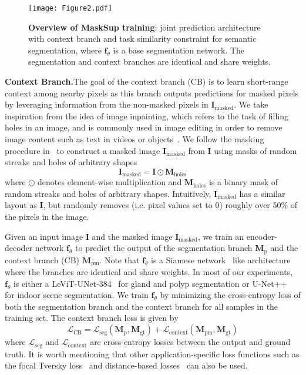 \documentclass{bmvc2k}
\begin{document}
\begin{figure*}[!htb]
\centering
\texttt{[image: Figure2.pdf]}
\caption{\textbf{Overview of MaskSup training}: joint prediction architecture with context branch and task similarity constraint for semantic segmentation, where $\bm{f}_{\theta}$ is a base segmentation network. The segmentation and context branches are identical and share weights.}
\label{Fig:overview}
\end{figure*}

\medskip\noindent\textbf{Context Branch.}\quad The goal of the context branch (CB) is to learn short-range context among nearby pixels as this branch outputs predictions for masked pixels by leveraging information from the non-masked pixels in $\bm{I}_\text{masked}$. We take inspiration from the idea of image inpainting, which refers to the task of filling holes in an image, and is commonly used in image editing in order to remove image content such as text in videos or objects~\cite{liu2018image,suvorov2022resolution}. We follow the masking procedure in~\cite{liu2018image} to construct a masked image $\bm{I}_\text{masked}$ from $\bm{I}$ using masks of random streaks and holes of arbitrary shapes
\begin{equation}
\bm{I}_\text{masked} = \bm{I} \odot \bm{M}_\text{holes}
\label{eq:masked}
\end{equation}
where $\odot$ denotes element-wise multiplication and $\bm{M}_\text{holes}$ is a binary mask of random streaks and holes of arbitrary shapes. Intuitively, $\bm{I}_\text{masked}$ has a similar layout as $\bm{I}$, but randomly removes (i.e. pixel values set to 0) roughly over 50\% of the pixels in the image.


Given an input image $\bm{I}$ and the masked image $\bm{I}_\text{masked}$, we train an encoder-decoder network $\bm{f}_{\theta}$ to predict the output of the segmentation branch $\bm{M}_\text{p}$ and the context branch (CB) $\bm{M}_\text{pm}$. Note that $\bm{f}_{\theta}$ is a Siamese network~\cite{bromley1993signature} like architecture where the branches are identical and share weights. In most of our experiments, $\bm{f}_{\theta}$ is either a LeViT-UNet-384~\cite{xu2021levit} for gland and polyp segmentation or U-Net++~\cite{zhou2019unet++} for indoor scene segmentation. We train $\bm{f}_{\theta}$ by minimizing the cross-entropy loss of both the segmentation branch and the context branch for all samples in the training set. The context branch loss is given by
\begin{equation}
\mathcal{L}_\text{CB} = \mathcal{L}_\text{seg} (\bm{M}_\text{p}, \bm{M}_\text{gt}) + \mathcal{L}_\text{context} (\bm{M}_\text{pm}, \bm{M}_\text{gt})
\label{eq:loss1}
\end{equation}
where $\mathcal{L}_\text{seg}$ and $\mathcal{L}_\text{context}$ are cross-entropy losses between the output and ground truth. It is worth mentioning that other application-specific loss functions such as the focal Tversky loss~\cite{abraham2019novel} and distance-based losses~\cite{karimi2019reducing, caliva2019distance} can also be used.
\end{document}
